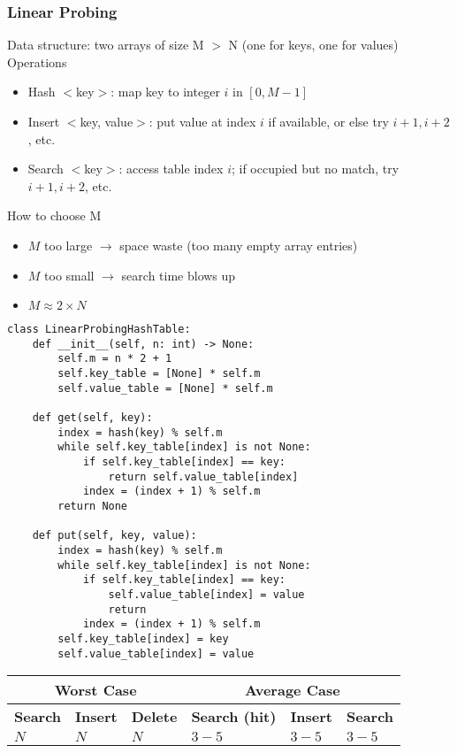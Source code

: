 \documentclass[a4paper]{article}
\begin{document}
\subsubsection*{Linear Probing}
Data structure: two arrays of size M $>$ N (one for keys, one for values)\\
Operations
\begin{itemize}
    \item Hash $<$key$>$: map key to integer $i$ in $[0, M-1]$
    \item Insert $<$key, value$>$: put value at index $i$ if available, or else try $i+1, i+2$, etc.
    \item Search $<$key$>$: access table index $i$; if occupied but no match, try $i+1, i+2$, etc.
\end{itemize}
How to choose M
\begin{itemize}
    \item $M$ too large $\to$ space waste (too many empty array entries)
    \item $M$ too small $\to$ search time blows up
    \item $M\approx 2\times N$
\end{itemize}

\begin{lstlisting}
class LinearProbingHashTable:
    def __init__(self, n: int) -> None:
        self.m = n * 2 + 1
        self.key_table = [None] * self.m
        self.value_table = [None] * self.m

    def get(self, key):
        index = hash(key) % self.m
        while self.key_table[index] is not None:
            if self.key_table[index] == key:
                return self.value_table[index]
            index = (index + 1) % self.m
        return None

    def put(self, key, value):
        index = hash(key) % self.m
        while self.key_table[index] is not None:
            if self.key_table[index] == key:
                self.value_table[index] = value
                return
            index = (index + 1) % self.m
        self.key_table[index] = key
        self.value_table[index] = value
\end{lstlisting}

\begin{spacing}{1.5}
\begin{tabularx}{1\textwidth}{|X|X|X|X|X|X|}
    \hline
    \multicolumn{3}{|c|}{\textbf{Worst Case}} &\multicolumn{3}{c|}{\textbf{Average Case}}\\
    \hline
    \textbf{Search} & \textbf{Insert} & \textbf{Delete} & \textbf{Search (hit)} & \textbf{Insert} & \textbf{Search}\\
    \hline
    $N$&$N$&$N$&$3-5$&$3-5$&$3-5$\\
    \hline
\end{tabularx}
\end{spacing}
\end{document}
